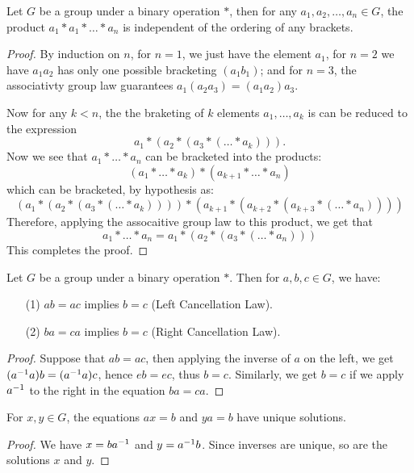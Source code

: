 \begin{theorem}\label{1.2.2}
    Let $G$ be a group under a binary operation  $\ast$, then for any  $a_1,
    a_2, \dots, a_n \in G$, the product $a_1 \ast a_1 \ast \dots \ast a_n$ is
    independent of the ordering of any brackets.
\end{theorem}
\begin{proof}
    By induction on $n$, for  $n=1$, we just have the element  $a_1$, for $n=2$
    we have $a_1a_2$ has only one possible bracketing $(a_1b_1)$; and for $n=3$,
    the associativty group law guarantees  $a_1(a_2a_3)=(a_1a_2)a_3$.

    Now for any $k<n$, the the braketing of  $k$ elements  $a_1, \dots, a_k$ is
    can be reduced to the expression
    \begin{equation*}
        a_1 \ast (a_2 \ast (a_3 \ast ( \dots \ast a_k))).
    \end{equation*}
Now we see that $a_1 \ast \dots \ast a_n$ can be bracketed into the products:
    \begin{equation*}
        (a_1 \ast \dots \ast a_k) \ast (a_{k+1} \ast \dots \ast a_n)
    \end{equation*}
which can be bracketed, by hypothesis as:
\begin{equation*}
    (a_1 \ast (a_2 \ast (a_3 \ast ( \dots \ast a_k)))) \ast
    (a_{k+1} \ast (a_{k+2} \ast (a_{k+3} \ast ( \dots \ast a_n))))
\end{equation*}
Therefore, applying the assocaitive group law to this product, we get that
\begin{equation*}
    a_1 \ast \dots \ast a_n=a_1 \ast (a_2 \ast (a_3 \ast ( \dots \ast a_n)))
\end{equation*}
This completes the proof.
\end{proof}

\begin{theorem}\label{1.2.3}
    Let $G$ be a group under a binary operation  $\ast$. Then for  $a,b,c \in
    G$, we have:
    \begin{enumerate}
        \item[(1)] $ab=ac$ implies  $b=c$ (Left Cancellation Law).

        \item[(2)] $ba=ca$ implies  $b=c$ (Right Cancellation Law).
    \end{enumerate}
\end{theorem}
\begin{proof}
    Suppose that $ab=ac$, then applying the inverse of $a$ on the left, we get
     $(a^{-1}a)b=(a^{-1}a)c$, hence $eb=ec$, thus  $b=c$. Similarly, we get
     $b=c$ if we apply  $a^{-1}$ to the right in the equation $ba=ca$.
\end{proof}
\begin{corollary}
    For $x,y \in G$, the equations  $ax=b$ and  $ya=b$ have unique solutions.
\end{corollary}
\begin{proof}
    We have $x=ba^{-1}$ and $y=a^{-1}b$. Since inverses are unique, so are the
    solutions $x$ and $y$.
\end{proof}

